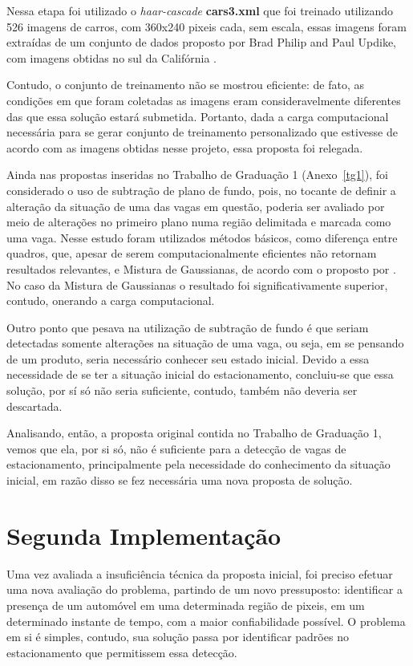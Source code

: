 \documentclass[ecp,tc]{iiufrgs}
\begin{document}
Nessa etapa foi utilizado o \textit{haar-cascade} \textbf{cars3.xml} que foi treinado utilizando 526 imagens de carros, com 360x240 pixeis cada, sem escala, essas imagens foram extraídas de um conjunto de dados proposto por Brad Philip and Paul Updike, com imagens obtidas no sul da Califórnia \cite{Oliveira2008}.

Contudo, o conjunto de treinamento não se mostrou eficiente: de fato, as condições em que foram coletadas as imagens eram consideravelmente diferentes das que essa solução estará submetida. Portanto, dada a carga computacional necessária para se gerar conjunto de treinamento personalizado que estivesse de acordo com as imagens obtidas nesse projeto, essa proposta foi relegada.

Ainda nas propostas inseridas no Trabalho de Graduação 1 (Anexo~\ref{tg1}), foi considerado o uso de subtração de plano de fundo, pois, no tocante de definir a alteração da situação de uma das vagas em questão, poderia ser avaliado por meio de alterações no primeiro plano numa região delimitada e marcada como uma vaga. Nesse estudo foram utilizados métodos básicos, como diferença entre quadros, que, apesar de serem computacionalmente eficientes não retornam resultados relevantes, e Mistura de Gaussianas, de acordo com o proposto por . No caso da Mistura de Gaussianas o resultado foi significativamente superior, contudo, onerando a carga computacional.

Outro ponto que pesava na utilização de subtração de fundo é que seriam detectadas somente alterações na situação de uma vaga, ou seja, em se pensando de um produto, seria necessário conhecer seu estado inicial. Devido a essa necessidade de se ter a situação inicial do estacionamento, concluiu-se que essa solução, por sí só não seria suficiente, contudo, também não deveria ser descartada.

Analisando, então, a proposta original contida no Trabalho de Graduação 1, vemos que ela, por si só, não é suficiente para a detecção de vagas de estacionamento, principalmente pela necessidade do conhecimento da situação inicial, em razão disso se fez necessária uma nova proposta de solução.

\section{Segunda Implementação}

Uma vez avaliada a insuficiência técnica da proposta inicial, foi preciso efetuar uma nova avaliação do problema, partindo de um novo pressuposto: identificar a presença de um automóvel em uma determinada região de pixeis, em um determinado instante de tempo, com a maior confiabilidade possível. O problema em si é simples, contudo, sua solução passa por identificar padrões no estacionamento que permitissem essa detecção.
\end{document}
